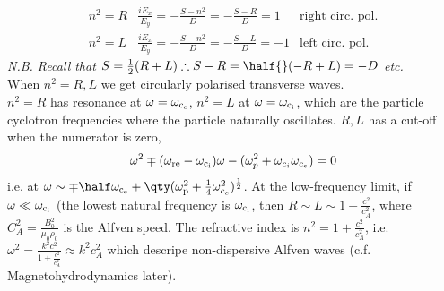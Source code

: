 \documentclass{book}         		                %
\begin{document}
\begin{align*}
  n^2 = R & \frac{iE_x}{E_y} = - \frac{S-n^2}{D} = - \frac{S-R}{D} = 1 & \text{right circ. pol.} \\
n^2 = L & \frac{i E_x}{E_y} = - \frac{S-n^2}{D} = - \frac{S-L}{D} = -1 & \text{left circ. pol.}
\end{align*}
{\em N.B. Recall that $S = \frac{1}{2} (R+L) \therefore S-R = \half{}(-R+L) = -D$ etc.} \\
When $n^2 = R, L$ we get circularly polarised transverse waves.\\
$n^2=R$ has resonance at $\omega = \omega_{\rm c_e}$, $n^2=L$ at $\omega=\omega_{\rm c_i}$, which are the particle cyclotron frequencies where the particle naturally oscillates.
$R, L$ has a cut-off when the numerator is zero,
\begin{equation}
  \label{eq:cutoff}
  \omega^2 \mp (\omega_{\rm re}-\omega_{\rm c_i}) \omega - (\omega_p^2 + \omega_{c_i}\omega_{c_e})=0
\end{equation}
i.e. at $\omega \sim \mp \half \omega_{\rm c_e}+ \qty(\omega_{\rm p}^2 + \frac{1}{4}\omega_{c_{e}}^2)^{\frac{1}{2}}$.
At the low-frequency limit, if $\omega \ll \omega_{\rm c_i}$ (the lowest natural frequency is $\omega_{\rm c_i}$, then $R \sim L \sim 1+ \frac{c^2}{c_A^2}$, where $C_A^2 = \frac{B_0^2}{\mu_0\rho_0}$ is the Alfven speed. The refractive index is $n^2 = 1+\frac{c^2}{c_A^2}$, i.e. $\omega^2 = \frac{k^2 c^2}{1 + \frac{c^2}{c_A^2}} \approx k^2c_A^2$ which descripe non-dispersive Alfven waves (c.f. Magnetohydrodynamics later).
\end{document}
